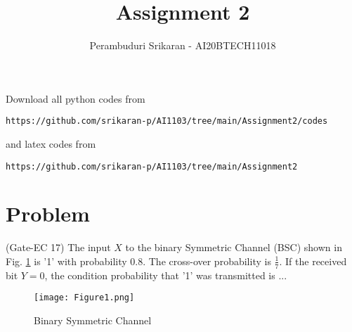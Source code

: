 \documentclass[journal,12pt,twocolumn]{IEEEtran}
\begin{document}
\let\StandardTheFigure\thefigure
\let\vec\mathbf
\renewcommand{\thefigure}{\theproblem}
\def\putbox#1#2#3{\makebox[0in][l]{\makebox[#1][l]{}\raisebox{\baselineskip}[0in][0in]{\raisebox{#2}[0in][0in]{#3}}}}
     \def\rightbox#1{\makebox[0in][r]{#1}}
     \def\centbox#1{\makebox[0in]{#1}}
     \def\topbox#1{\raisebox{-\baselineskip}[0in][0in]{#1}}
     \def\midbox#1{\raisebox{-0.5\baselineskip}[0in][0in]{#1}}
\vspace{3cm}
\title{Assignment 2}
\author{Perambuduri Srikaran - AI20BTECH11018}
\maketitle
\newpage
\bigskip
\renewcommand{\thefigure}{\theenumi}
\renewcommand{\thetable}{\theenumi}
Download all python codes from
\begin{lstlisting}
https://github.com/srikaran-p/AI1103/tree/main/Assignment2/codes
\end{lstlisting}
and latex codes from 
\begin{lstlisting}
https://github.com/srikaran-p/AI1103/tree/main/Assignment2
\end{lstlisting}
\section*{Problem}
(Gate-EC 17) The input $X$ to the binary Symmetric Channel (BSC) shown in Fig. \ref{fig:question} is '1' with probability 0.8. The cross-over probability is $\frac{1}{7}$. If the received bit $Y = 0$, the condition probability that '1' was transmitted is ...

\begin{figure}[htp]
    \centering
    \texttt{[image: Figure1.png]}
    \caption{Binary Symmetric Channel}
    \label{fig:question}
\end{figure}
\end{document}
